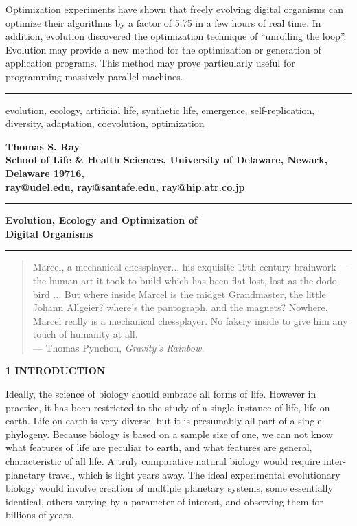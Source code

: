 Optimization experiments have shown that freely evolving digital organisms
can optimize their algorithms by a factor of 5.75 in a few hours of real
time.  In addition, evolution discovered the optimization technique of
``unrolling the loop''.  Evolution may provide a new method for the
optimization or generation of application programs.  This method may
prove particularly useful for programming massively parallel machines.

\LP
\rule[6pt]{6.5in}{1pt}
evolution, ecology, artificial life, synthetic life, emergence,
self-replication, diversity, adaptation, coevolution, optimization
\eLP

\newpage


\LP
\bf Thomas S. Ray\rm \\
School of Life \& Health Sciences, University of Delaware, Newark, Delaware
19716,\\
ray@udel.edu, ray@santafe.edu, ray@hip.atr.co.jp\\
\rule[6pt]{6.5in}{1pt}
\Large \bf Evolution, Ecology and Optimization of\\
Digital Organisms\rm \normalsize\\
\rule[6pt]{6.5in}{2pt}
\vspace{5cm}

\begin{quote}
Marcel, a mechanical chessplayer... his exquisite 19th-century brainwork
--- the human art it took to build which has been flat lost, lost as the
dodo bird ...  But where inside Marcel is the midget Grandmaster, the
little Johann Allgeier?  where's the pantograph, and the magnets?  Nowhere.
Marcel really is a mechanical chessplayer.  No fakery inside to give
him any touch of humanity at all.\\
\hspace*{2in}--- Thomas Pynchon, \it Gravity's Rainbow\rm .
\end{quote}

\large \bf 1 INTRODUCTION\rm \normalsize
\eLP

Ideally, the science of biology should embrace all forms of life.  However
in practice, it has been restricted to the study of a single instance of
life, life on earth.  Life on earth is very diverse, but it is presumably
all part of a single phylogeny.  Because biology is based on a sample size
of one, we can not know what features of life are peculiar to earth, and
what features are general, characteristic of all life.  A truly comparative
natural biology would require inter-planetary travel, which is light
years away.  The ideal experimental evolutionary biology would involve
creation of multiple planetary systems, some essentially identical,
others varying by a parameter of interest, and observing them for billions
of years.

